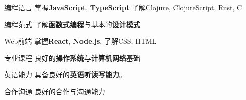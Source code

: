 

\begin{cvskills}

    \cvskill
    {编程语言} %
    {掌握\textbf{JavaScript}, \textbf{TypeScript} \hspace{1mm} 了解Clojure, ClojureScript, Rust, C} %

    \cvskill
    {编程范式} %
    {了解\textbf{函数式编程}与基本的\textbf{设计模式}} %

    \cvskill
    {Web前端} %
    {掌握\textbf{React}, \textbf{Node.js}, 了解CSS, HTML} %

    \cvskill
    {专业课程} %
    {良好的\textbf{操作系统}与\textbf{计算机网络}基础} %

    \cvskill
    {英语能力} %
    {具备良好的\textbf{英语听读写能力}。} %

    \cvskill
    {合作沟通} %
    {良好的合作与沟通能力} %

\end{cvskills}
